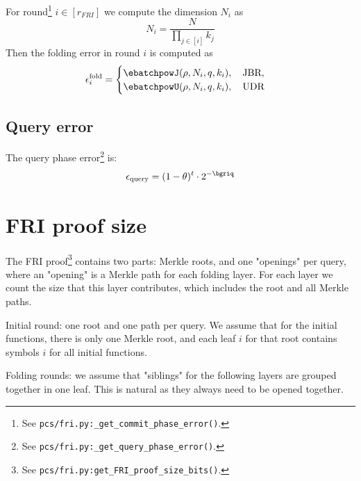 For round\footnote{See \texttt{pcs/fri.py:\_get\_commit\_phase\_error()}.} $i\in[r_{FRI}]$ we compute the dimension $N_i$ as
$$
N_i = \frac{N}{\prod_{j\in[i]}k_j}
$$
Then the folding error in round $i$ is computed as
\begin{equation}
    \epsilon_{i}^{\mathrm{fold}} =
\begin{cases}
   \ebatchpowJ(\rho,N_i,q,k_i ),\quad \text{JBR}, \\
   \ebatchpowU(\rho,N_i,q,k_i ),\quad \text{UDR}
\end{cases}
\end{equation}

\subsection{Query error}

The query phase error\footnote{See \texttt{pcs/fri.py:\_get\_query\_phase\_error()}.} is:
\begin{equation}
    \epsilon_{\mathrm{query}} = (1-\theta)^{t}\cdot 2^{-\bgriq}
\end{equation}

\newpage
\section{FRI proof size}

The FRI proof\footnote{See \texttt{pcs/fri.py:get\_FRI\_proof\_size\_bits()}.} contains two parts: Merkle roots, and one "openings" per query,
  where an "opening" is a Merkle path for each folding layer.
     For each layer we count the size that
     this layer contributes, which includes the root and all Merkle paths.

Initial round: one root and one path per query.
     We assume that for the initial functions, there is only one Merkle root, and
     each leaf $i$ for that root contains symbols $i$ for all initial functions.

    Folding rounds:
     we assume that "siblings" for the following layers are grouped together
     in one leaf. This is natural as they always need to be opened together.

